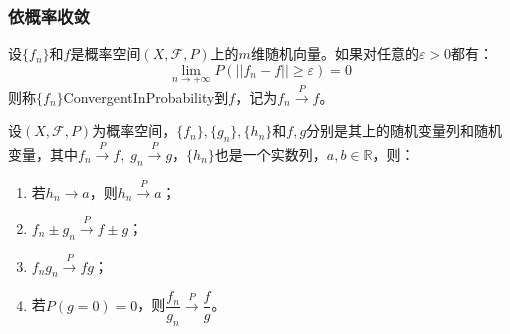 \subsubsection{依概率收敛}
\begin{definition}
	设$\{f_n\}$和$f$是概率空间$(X,\mathscr{F},P)$上的$m$维随机向量。如果对任意的$\varepsilon>0$都有：
	\begin{equation*}
		\lim_{n\to+\infty}P(||f_n-f||\geqslant\varepsilon)=0
	\end{equation*}
	则称$\{f_n\}$\gls{ConvergentInProbability}到$f$，记为$f_n\overset{P}{\longrightarrow}f$。
\end{definition}
\begin{property}\label{prop:ConvergenceInProbability}
	设$(X,\mathscr{F},P)$为概率空间，$\{f_n\},\{g_n\},\{h_n\}$和$f,g$分别是其上的随机变量列和随机变量，其中$f_n\overset{P}{\longrightarrow}f,\;g_n\overset{P}{\longrightarrow}g$，$\{h_n\}$也是一个实数列，$a,b\in\mathbb{R}$，则：
	\begin{enumerate}
		\item 若$h_n\to a$，则$h_n\overset{P}{\longrightarrow}a$；
		\item $f_n\pm g_n\overset{P}{\longrightarrow}f\pm g$；
		\item $f_ng_n\overset{P}{\longrightarrow}fg$；
		\item 若$P(g=0)=0$，则$\dfrac{f_n}{g_n}\overset{P}{\longrightarrow}\dfrac{f}{g}$。
	\end{enumerate}
\end{property}
